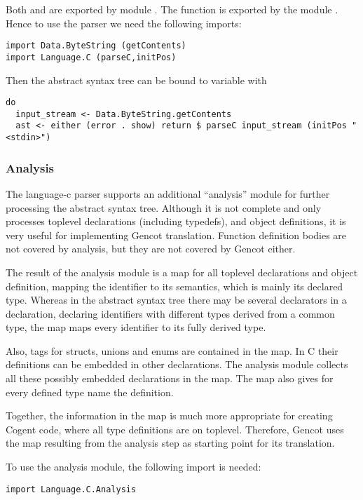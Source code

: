 Both  and  are exported by module . The function 
is exported by the module . Hence to use the parser we need the following imports:
\begin{verbatim}
import Data.ByteString (getContents)
import Language.C (parseC,initPos)
\end{verbatim}

Then the abstract syntax tree can be bound to variable  with
\begin{verbatim}
do
  input_stream <- Data.ByteString.getContents
  ast <- either (error . show) return $ parseC input_stream (initPos "<stdin>")
\end{verbatim}

\subsubsection{Analysis}

The language-c parser supports an additional ``analysis'' module for further processing the abstract syntax tree.
Although it is not complete and only processes toplevel declarations (including typedefs), and object definitions, it is very
useful for implementing Gencot translation. Function definition bodies are not covered by analysis, but they are
not covered by Gencot either.

The result of the analysis module is a map for all toplevel declarations and object definition, mapping the identifier
to its semantics, which is mainly its declared type. Whereas in the abstract syntax tree there may be several declarators
in a declaration, declaring identifiers with different types derived from a common type, the map maps every identifier
to its fully derived type. 

Also, tags for structs, unions and enums are contained in the map. In C their definitions can be embedded in other declarations.
The analysis module collects all these possibly embedded declarations in the map. The map also gives for every defined type name
the definition.

Together, the information in the map is much more appropriate for creating Cogent code, where all type definitions are on
toplevel. Therefore, Gencot uses the map resulting from the analysis step as starting point for its translation.

To use the analysis module, the following import is needed:
\begin{verbatim}
import Language.C.Analysis
\end{verbatim}

